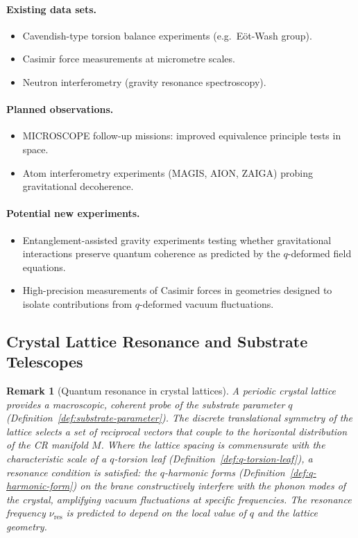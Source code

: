 \documentclass[12pt,a4paper]{report}
\newtheorem{remark}[theorem]{Remark}
\begin{document}
\paragraph{Existing data sets.}
\begin{itemize}
  \item Cavendish-type torsion balance experiments (e.g.\ E\"ot-Wash group).
  \item Casimir force measurements at micrometre scales.
  \item Neutron interferometry (gravity resonance spectroscopy).
\end{itemize}

\paragraph{Planned observations.}
\begin{itemize}
  \item MICROSCOPE follow-up missions: improved equivalence principle
        tests in space.
  \item Atom interferometry experiments (MAGIS, AION, ZAIGA) probing
        gravitational decoherence.
\end{itemize}

\paragraph{Potential new experiments.}
\begin{itemize}
  \item Entanglement-assisted gravity experiments testing whether
        gravitational interactions preserve quantum coherence as predicted
        by the $q$-deformed field equations.
  \item High-precision measurements of Casimir forces in geometries
        designed to isolate contributions from $q$-deformed vacuum
        fluctuations.
\end{itemize}

\subsection{Crystal Lattice Resonance and Substrate Telescopes}
\label{sec:crystal-resonance}

\begin{remark}[Quantum resonance in crystal lattices]
\label{rem:crystal-resonance}
A periodic crystal lattice provides a macroscopic, coherent probe of the
substrate parameter $q$ (Definition~\ref{def:substrate-parameter}).  The
discrete translational symmetry of the lattice selects a set of reciprocal
vectors that couple to the horizontal distribution of the CR manifold
$M$.  Where the lattice spacing is commensurate with the characteristic scale
of a $q$-torsion leaf (Definition~\ref{def:q-torsion-leaf}), a resonance
condition is satisfied: the $q$-harmonic forms
(Definition~\ref{def:q-harmonic-form}) on the brane constructively interfere
with the phonon modes of the crystal, amplifying vacuum fluctuations at
specific frequencies.  The resonance frequency $\nu_{\mathrm{res}}$ is
predicted to depend on the local value of $q$ and the lattice geometry.
\end{remark}
\end{document}
